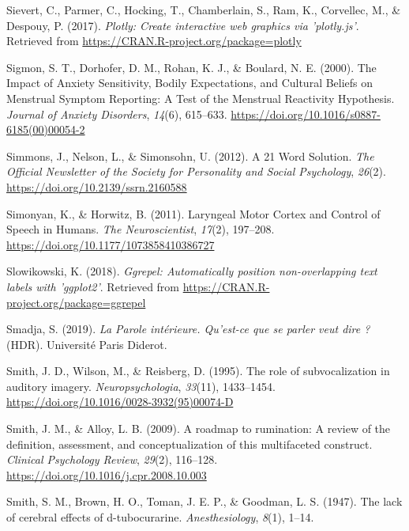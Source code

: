 \documentclass[a4paper,12pt,twoside,openright,oldfontcommands]{memoir}
\begin{document}
\leavevmode\hypertarget{ref-R-plotly}{}%
Sievert, C., Parmer, C., Hocking, T., Chamberlain, S., Ram, K., Corvellec, M., \& Despouy, P. (2017). \emph{Plotly: Create interactive web graphics via 'plotly.js'}. Retrieved from \url{https://CRAN.R-project.org/package=plotly}

\leavevmode\hypertarget{ref-sigmon_impact_2000}{}%
Sigmon, S. T., Dorhofer, D. M., Rohan, K. J., \& Boulard, N. E. (2000). The Impact of Anxiety Sensitivity, Bodily Expectations, and Cultural Beliefs on Menstrual Symptom Reporting: A Test of the Menstrual Reactivity Hypothesis. \emph{Journal of Anxiety Disorders}, \emph{14}(6), 615--633. \url{https://doi.org/10.1016/s0887-6185(00)00054-2}

\leavevmode\hypertarget{ref-simmons_21_2012}{}%
Simmons, J., Nelson, L., \& Simonsohn, U. (2012). A 21 Word Solution. \emph{The Official Newsletter of the Society for Personality and Social Psychology}, \emph{26}(2). \url{https://doi.org/10.2139/ssrn.2160588}

\leavevmode\hypertarget{ref-simonyan_laryngeal_2011}{}%
Simonyan, K., \& Horwitz, B. (2011). Laryngeal Motor Cortex and Control of Speech in Humans. \emph{The Neuroscientist}, \emph{17}(2), 197--208. \url{https://doi.org/10.1177/1073858410386727}

\leavevmode\hypertarget{ref-R-ggrepel}{}%
Slowikowski, K. (2018). \emph{Ggrepel: Automatically position non-overlapping text labels with 'ggplot2'}. Retrieved from \url{https://CRAN.R-project.org/package=ggrepel}

\leavevmode\hypertarget{ref-smadja_parole_2019}{}%
Smadja, S. (2019). \emph{La Parole intérieure. Qu'est-ce que se parler veut dire ?} (HDR). Université Paris Diderot.

\leavevmode\hypertarget{ref-smith_role_1995}{}%
Smith, J. D., Wilson, M., \& Reisberg, D. (1995). The role of subvocalization in auditory imagery. \emph{Neuropsychologia}, \emph{33}(11), 1433--1454. \url{https://doi.org/10.1016/0028-3932(95)00074-D}

\leavevmode\hypertarget{ref-Smith2009}{}%
Smith, J. M., \& Alloy, L. B. (2009). A roadmap to rumination: A review of the definition, assessment, and conceptualization of this multifaceted construct. \emph{Clinical Psychology Review}, \emph{29}(2), 116--128. \url{https://doi.org/10.1016/j.cpr.2008.10.003}

\leavevmode\hypertarget{ref-smith_lack_1947}{}%
Smith, S. M., Brown, H. O., Toman, J. E. P., \& Goodman, L. S. (1947). The lack of cerebral effects of d-tubocurarine. \emph{Anesthesiology}, \emph{8}(1), 1--14.
\end{document}
